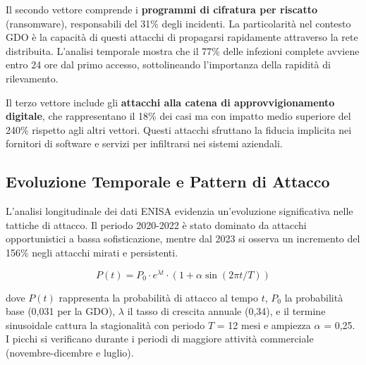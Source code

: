 Il secondo vettore comprende i \textbf{programmi di cifratura per riscatto} (ransomware), responsabili del 31\% degli incidenti. La particolarità nel contesto GDO è la capacità di questi attacchi di propagarsi rapidamente attraverso la rete distribuita. L'analisi temporale mostra che il 77\% delle infezioni complete avviene entro 24 ore dal primo accesso, sottolineando l'importanza della rapidità di rilevamento.

Il terzo vettore include gli \textbf{attacchi alla catena di approvvigionamento digitale}, che rappresentano il 18\% dei casi ma con impatto medio superiore del 240\% rispetto agli altri vettori. Questi attacchi sfruttano la fiducia implicita nei fornitori di software e servizi per infiltrarsi nei sistemi aziendali.

\subsection{\texorpdfstring{Evoluzione Temporale e Pattern di Attacco}{2.3.2 - Evoluzione Temporale e Pattern di Attacco}}
\label{subsec:evoluzione_temporale}

L'analisi longitudinale dei dati ENISA\autocite{enisa2024threat} evidenzia un'evoluzione significativa nelle tattiche di attacco. Il periodo 2020-2022 è stato dominato da attacchi opportunistici a bassa sofisticazione, mentre dal 2023 si osserva un incremento del 156\% negli attacchi mirati e persistenti.

\begin{equation}
\label{eq:probabilita_attacco}
P(t) = P_0 \cdot e^{\lambda t} \cdot (1 + \alpha \sin(2\pi t/T))
\end{equation}

dove $P(t)$ rappresenta la probabilità di attacco al tempo $t$, $P_0$ la probabilità base (0,031 per la GDO), $\lambda$ il tasso di crescita annuale (0,34), e il termine sinusoidale cattura la stagionalità con periodo $T$ = 12 mesi e ampiezza $\alpha$ = 0,25. I picchi si verificano durante i periodi di maggiore attività commerciale (novembre-dicembre e luglio).

